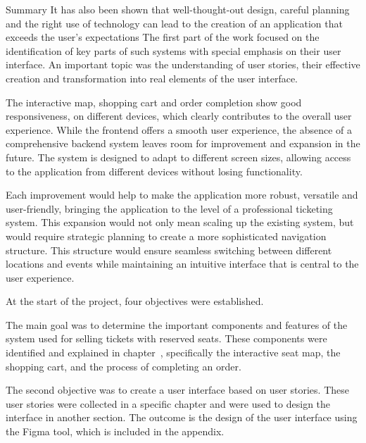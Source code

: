 \begin{section}{Summary}
    \label{sec:summary}
    It has also been shown that well-thought-out design, careful planning and the right use of technology can lead to the creation of an application that exceeds the user's expectations The first part of the work focused on the identification of key parts of such systems with special emphasis on their user interface.
    An important topic was the understanding of user stories, their effective creation and transformation into real elements of the user interface.

    The interactive map, shopping cart and order completion show good responsiveness, on different devices, which clearly contributes to the overall user experience.
    While the frontend offers a smooth user experience, the absence of a comprehensive backend system leaves room for improvement and expansion in the future.
    The system is designed to adapt to different screen sizes, allowing access to the application from different devices without losing functionality.

    Each improvement would help to make the application more robust, versatile and user-friendly, bringing the application to the level of a professional ticketing system.
    This expansion would not only mean scaling up the existing system, but would require strategic planning to create a more sophisticated navigation structure.
    This structure would ensure seamless switching between different locations and events while maintaining an intuitive interface that is central to the user experience.

    At the start of the project, four objectives were established.

    The main goal was to determine the important components and features of the system used for selling tickets with reserved seats.
    These components were identified and explained in chapter~, specifically the interactive seat map, the shopping cart, and the process of completing an order.

    The second objective was to create a user interface based on user stories.
    These user stories were collected in a specific chapter and were used to design the interface in another section.
    The outcome is the design of the user interface using the Figma tool, which is included in the appendix.


\end{section}
